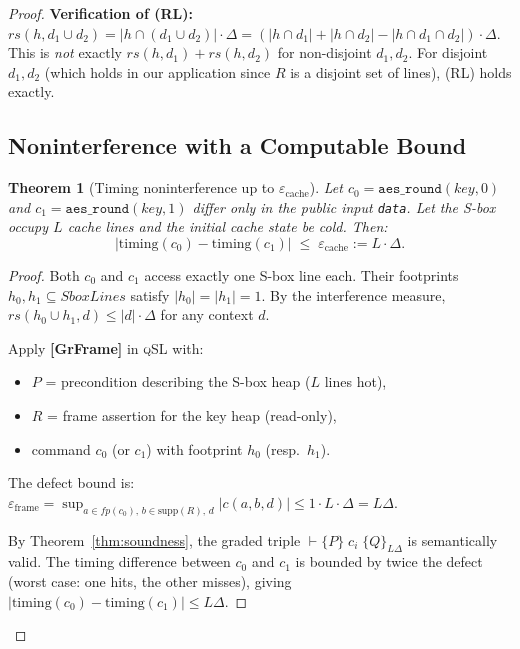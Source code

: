 \documentclass[acmsmall,sigplan,anonymous,review,screen]{acmart}
\theoremstyle{plain}
\newtheorem{theorem}{Theorem}[section]
\theoremstyle{definition}
\newcommand{\qSL}{\textsc{qSL}\xspace}
\newcommand{\rs}{\mathit{rs}}
\newcommand{\fp}{\mathit{fp}}
\newcommand{\defect}{\varepsilon}
\begin{document}
\begin{proof}
\textbf{Verification of (RL):}
$\rs(h, d_1 \cup d_2) = |h \cap (d_1 \cup d_2)| \cdot \Delta
= (|h \cap d_1| + |h \cap d_2| - |h \cap d_1 \cap d_2|) \cdot \Delta$.
This is \emph{not} exactly $\rs(h, d_1) + \rs(h, d_2)$ for non-disjoint
$d_1, d_2$.  For disjoint $d_1, d_2$ (which holds in our application
since $R$ is a disjoint set of lines), (RL) holds exactly.

\subsection{Noninterference with a Computable Bound}
\label{sec:casestudy:ni}

\begin{theorem}[Timing noninterference up to $\defect_{\mathrm{cache}}$]
\label{thm:ct-ni}
  Let $c_0 = \texttt{aes\_round}(\mathit{key}, 0)$ and
  $c_1 = \texttt{aes\_round}(\mathit{key}, 1)$ differ only in the public
  input \texttt{data}.  Let the S-box occupy $L$ cache lines and the
  initial cache state be \emph{cold}.  Then:
  \[
    |\mathrm{timing}(c_0) - \mathrm{timing}(c_1)|
    \;\leq\; \defect_{\mathrm{cache}} := L \cdot \Delta.
  \]
\end{theorem}

\begin{proof}
  Both $c_0$ and $c_1$ access exactly one S-box line each.  Their
  footprints $h_0, h_1 \subseteq \mathit{SboxLines}$ satisfy
  $|h_0| = |h_1| = 1$.  By the interference measure,
  $\rs(h_0 \cup h_1, d) \leq |d| \cdot \Delta$ for any context $d$.

  Apply \textbf{[GrFrame]} in \qSL with:
  \begin{itemize}[itemsep=2pt]
    \item $P$ = precondition describing the S-box heap ($L$ lines hot),
    \item $R$ = frame assertion for the key heap (read-only),
    \item command $c_0$ (or $c_1$) with footprint $h_0$ (resp.\ $h_1$).
  \end{itemize}
  The defect bound is:
  $\defect_{\mathrm{frame}} = \sup_{a \in \fp(c_0),\, b \in \mathrm{supp}(R),\, d}
  |c(a, b, d)| \leq 1 \cdot L \cdot \Delta = L\Delta$.

  By Theorem~\ref{thm:soundness}, the graded triple
  $\vdash \{P\}\; c_i\; \{Q\}_{L\Delta}$ is semantically valid.
  The timing difference between $c_0$ and $c_1$ is bounded by twice the
  defect (worst case: one hits, the other misses), giving
  $|\mathrm{timing}(c_0) - \mathrm{timing}(c_1)| \leq L\Delta$.
\end{proof}


\end{proof}
\end{document}
